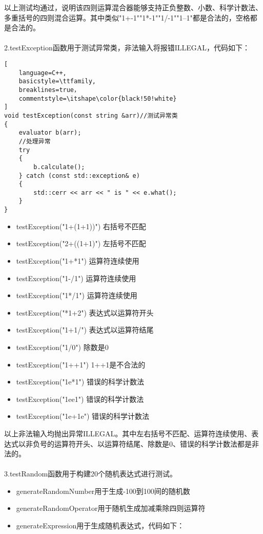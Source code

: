 \documentclass[UTF8]{ctexart}
\begin{document}
以上测试均通过，说明该四则运算混合器能够支持正负整数、小数、科学计数法、多重括号的四则混合运算。其中类似"1+-1""1*-1""1/-1""1--1"都是合法的，空格都是合法的。
\\\\
2.testException函数用于测试异常类，非法输入将报错ILLEGAL，代码如下：
\begin{lstlisting}[
    language=C++,
    basicstyle=\ttfamily,
    breaklines=true，
    commentstyle=\itshape\color{black!50!white}
]
void testException(const string &arr)//测试异常类
{
    evaluator b(arr);
    //处理异常
    try 
    {
        b.calculate();
    } catch (const std::exception& e) 
    {
        std::cerr << arr << " is " << e.what();
    }
}
\end{lstlisting}
\begin{itemize}
\item testException("1+(1+1))") 右括号不匹配
\item testException("2+((1+1)") 左括号不匹配
\item testException("1+*1") 运算符连续使用
\item testException("1-/1") 运算符连续使用
\item testException("1*/1") 运算符连续使用
\item testException("*1+2") 表达式以运算符开头
\item testException("1+1/") 表达式以运算符结尾
\item testException("1/0") 除数是0
\item testException("1++1") 1++1是不合法的
\item testException("1e*1") 错误的科学计数法
\item testException("1ee1") 错误的科学计数法
\item testException("1e+1e") 错误的科学计数法
\end{itemize}
以上非法输入均抛出异常ILLEGAL。其中左右括号不匹配、运算符连续使用、表达式以非负号的运算符开头、以运算符结尾、除数是0、错误的科学计数法都是非法的。
\\\\
3.testRandom函数用于构建20个随机表达式进行测试。
\begin{itemize}
\item generateRandomNumber用于生成-100到100间的随机数
\item generateRandomOperator用于随机生成加减乘除四则运算符
\item generateExpression用于生成随机表达式，代码如下：
\end{itemize}
\end{document}

